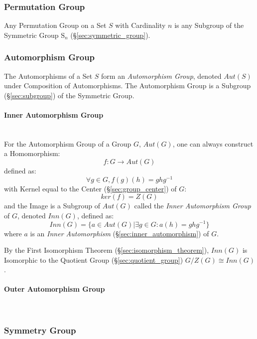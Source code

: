 \subsubsection{Permutation Group}\label{sec:permutation_group}

Any Permutation Group on a Set $S$ with Cardinality $n$ is any
Subgroup of the Symmetric Group $\mathrm{S}_n$
(\S\ref{sec:symmetric_group}).



\subsubsection{Automorphism Group}\label{sec:automorphism_group}

The Automorphisms of a Set $S$ form an \emph{Automorphism
  Group}, denoted $Aut(S)$ under Composition of Automorphisms. The
Automorphism Group is a Subgroup (\S\ref{sec:subgroup}) of the
Symmetric Group.



\paragraph{Inner Automorphism Group}\label{sec:inner_automorphism_group}
\hfill \\

For the Automorphism Group of a Group $G$, $Aut(G)$, one can always
construct a Homomorphism:
\[
    f : G \rightarrow Aut(G)
\]
defined as:
\[
    \forall g \in G, f (g) (h) = g h g^{-1}
\]
with Kernel equal to the Center (\S\ref{sec:group_center}) of $G$:
\[
    ker(f) = Z(G)
\]
and the Image is a Subgroup of $Aut(G)$ called the \emph{Inner
  Automorphism Group} of $G$, denoted $Inn(G)$, defined as:
\[
    Inn(G) = \{ a \in Aut(G) | \exists g \in G : a(h) = g h g^{-1} \}
\]
where $a$ is an \emph{Inner Automorphism}
(\S\ref{sec:inner_automorphism}) of $G$.

By the First Isomorphism Theorem (\S\ref{sec:isomorphism_theorem}),
$Inn(G)$ is Isomorphic to the Quotient Group
(\S\ref{sec:quotient_group}) $G / Z(G) \cong Inn(G)$.



\paragraph{Outer Automorphism Group}\label{sec:outer_automorphism_group}
\hfill \\



\subsubsection{Symmetry Group}\label{sec:symmetry_group}

